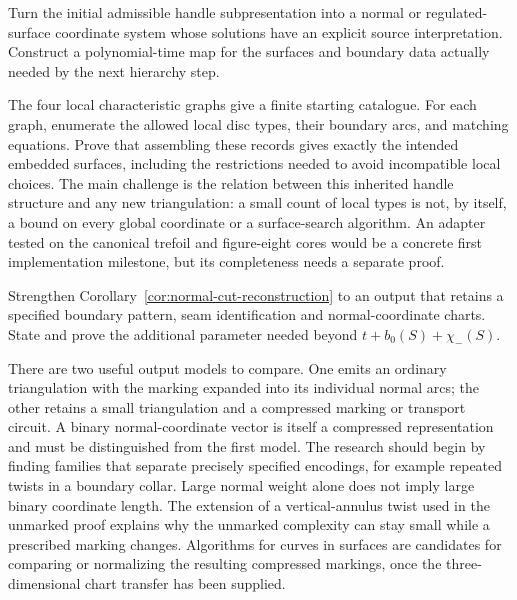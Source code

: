 \begin{problem}
\label{prob:core-normal-adapter}
Turn the initial admissible handle subpresentation into a normal or
regulated-surface coordinate system whose solutions have an explicit
source interpretation.  Construct a polynomial-time map for the surfaces
and boundary data actually needed by the next hierarchy step.
\end{problem}

The four local characteristic graphs give a finite starting catalogue.
For each graph, enumerate the allowed local disc types, their boundary
arcs, and matching equations.  Prove that assembling these records gives
exactly the intended embedded surfaces, including the restrictions needed
to avoid incompatible local choices.  The main challenge is the relation
between this inherited handle structure and any new triangulation: a
small count of local types is not, by itself, a bound on every global
coordinate or a surface-search algorithm.  An adapter tested on the
canonical trefoil and figure-eight cores would be a concrete first
implementation milestone, but its completeness needs a separate proof.

\begin{problem}
Strengthen Corollary~\ref{cor:normal-cut-reconstruction} to an output
that retains a specified boundary pattern, seam identification and
normal-coordinate charts.  State and prove the additional parameter
needed beyond $t+b_0(S)+\chi_-(S)$.
\end{problem}

There are two useful output models to compare.  One emits an ordinary
triangulation with the marking expanded into its individual normal arcs;
the other retains a small triangulation and a compressed marking or
transport circuit.  A binary normal-coordinate vector is itself a
compressed representation and must be distinguished from the first model.
The research should begin by finding families that separate precisely
specified encodings, for example repeated twists in a boundary collar.
Large normal weight alone does not imply large binary coordinate length.
The extension of a vertical-annulus twist used in
the unmarked proof explains why the unmarked complexity can stay small
while a prescribed marking changes.  Algorithms for curves in surfaces
\cite{Lackenby2026Curves} are candidates for comparing or normalizing the
resulting compressed markings, once the three-dimensional chart transfer
has been supplied.

